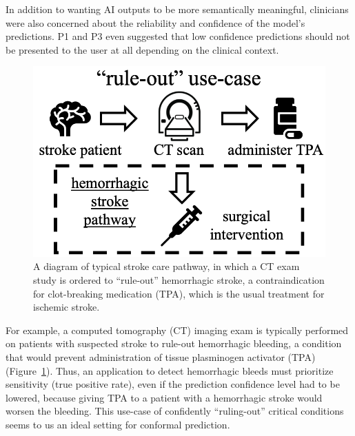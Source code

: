 \documentclass[letterpaper]{article} %
\begin{document}
    In addition to wanting AI outputs to be more semantically meaningful, clinicians were also concerned about the reliability and confidence of the model's predictions.
    P1 and P3 even suggested that low confidence predictions should not be presented to the user at all depending on the clinical context.

    \begin{figure}[t]
    \centering
    \includegraphics[width=0.80\columnwidth]{LaTeX/rule-out.png}
    \caption{A diagram of typical stroke care pathway, in which a CT exam study is ordered to ``rule-out'' hemorrhagic stroke, a contraindication for clot-breaking medication (TPA), which is the usual treatment for ischemic stroke.}
    \label{fig:rule-out}
    \end{figure}
    For example, a computed tomography (CT) imaging exam is typically performed on patients with suspected stroke to rule-out hemorrhagic bleeding, a condition that would prevent administration of tissue plasminogen activator (TPA) (Figure~\ref{fig:rule-out}).
    Thus, an application to detect hemorrhagic bleeds must prioritize sensitivity (true positive rate), even if the prediction confidence level had to be lowered, because giving TPA to a patient with a hemorrhagic stroke would worsen the bleeding.
    This use-case of confidently ``ruling-out'' critical conditions seems to us an ideal setting for conformal prediction.
\end{document}

